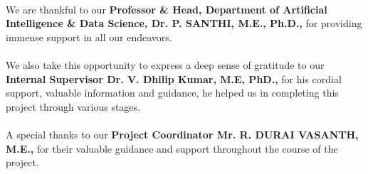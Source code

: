 \documentclass[10pt]{report}
\begin{document}
\begin{center}
{\large{\paragraph{}We are thankful to our \textbf{Professor \& Head, Department of Artificial Intelligence \& Data Science, Dr. P. SANTHI, M.E., Ph.D.,} for providing immense support in all our endeavors.}
\large{\paragraph{}We also take this opportunity to express a deep sense of gratitude to our \textbf{Internal
Supervisor Dr. V. Dhilip Kumar, M.E, PhD.,} for his cordial support, valuable
information and guidance, he helped us in completing this project through various stages. }
\large{\paragraph{}A special thanks to our \textbf{Project Coordinator Mr. R. DURAI VASANTH, M.E., } for their valuable guidance and support throughout the course of the project.}

}
\end{center}
\end{document}
